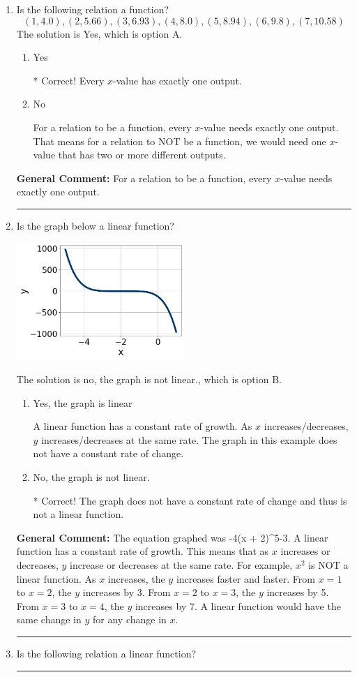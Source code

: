 \documentclass{extbook}[14pt]
\newcommand{\litem}[1]{\item #1

\rule{\textwidth}{0.4pt}}
\begin{document}
\begin{enumerate}\litem{
Is the following relation a function?
\[ (1, 4.0), (2, 5.66), (3, 6.93), (4, 8.0), (5, 8.94), (6, 9.8), (7, 10.58) \]The solution is Yes, which is option A.

\begin{enumerate}[label=\Alph*.]
\item Yes

* Correct! Every $x$-value has exactly one output.
\item No

For a relation to be a function, every $x$-value needs exactly one output. That means for a relation to NOT be a function, we would need one $x$-value that has two or more different outputs.
\end{enumerate}


\textbf{General Comment:} For a relation to be a function, every $x$-value needs exactly one output.
}
\litem{
Is the graph below a linear function?

\begin{center}
    \includegraphics[width=0.5\textwidth]{../Figures/MA_8_F_1_2_graphC.png}
\end{center}


The solution is no, the graph is not linear., which is option B.

\begin{enumerate}[label=\Alph*.]
\item Yes, the graph is linear

A linear function has a constant rate of growth. As $x$ increases/decreases, $y$ increases/decreases at the same rate. The graph in this example does not have a constant rate of change.
\item No, the graph is not linear.

* Correct! The graph does not have a constant rate of change and thus is not a linear function.
\end{enumerate}


\textbf{General Comment:} The equation graphed was -4(x + 2)^5-3. A linear function has a constant rate of growth. This means that as $x$ increases or decreases, $y$ increase or decreases at the same rate. For example, $x^2$ is NOT a linear function. As $x$ increases, the $y$ increases faster and faster. From $x=1$ to $x=2$, the $y$ increases by 3. From $x=2$ to $x=3$, the $y$ increases by 5. From $x=3$ to $x=4$, the $y$ increases by 7. A linear function would have the same change in $y$ for any change in $x$.
}
\litem{
Is the following relation a linear function?


}
\end{enumerate}
\end{document}

